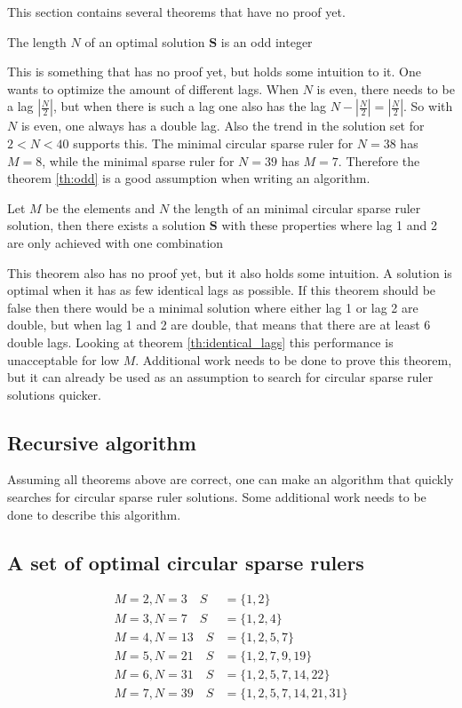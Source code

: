 \documentclass[a4paper, openany, oneside]{memoir}
\begin{document}
This section contains several theorems that have no proof yet.

\begin{blockTheorem} \label{th:odd}\nolinebreak
    The length $N$ of an optimal solution $\mathbf{S}$ is an odd integer \nolinebreak
\end{blockTheorem}

This is something that has no proof yet, but holds some intuition to it. One wants to optimize the amount of different lags. When $N$ is even, there  needs to be a lag $|\frac{N}{2}|$, but when there is such a lag one also has the lag $N-|\frac{N}{2}|=|\frac{N}{2}|$. So with $N$ is even, one always has a double lag. Also the trend in the solution set for $2<N<40$ supports this. The minimal circular sparse ruler for $N=38$ has $M=8$, while the minimal sparse ruler for $N=39$ has $M=7$. Therefore the theorem \ref{th:odd} is a good assumption when writing an algorithm.

\begin{blockTheorem} \label{th:lag1_2}\nolinebreak
    Let $M$ be the elements and $N$ the length of an minimal circular sparse ruler solution, then there exists a solution $\mathbf{S}$ with these properties where lag 1 and 2 are only achieved with one combination   \nolinebreak
\end{blockTheorem}

This theorem also has no proof yet, but it also holds some intuition. A solution is optimal when it has as few identical lags as possible. If this theorem should be false then there would be a minimal solution where either lag 1 or lag 2 are double, but when lag 1 and 2 are double, that means that there are at least 6 double lags. Looking at theorem \ref{th:identical_lags} this performance is unacceptable for low $M$. Additional work needs to be done to prove this theorem, but it can already be used as an assumption to search for circular sparse ruler solutions quicker.

\subsection{Recursive algorithm}
Assuming all theorems above are correct, one can make an algorithm that quickly searches for circular sparse ruler solutions. Some additional work needs to be done to describe this algorithm.

\subsection{A set of optimal circular sparse rulers}
\begin{align}
M=2,N=3  \quad S&=\{1,2\}\\
M=3,N=7  \quad S&=\{1,2,4\}\\
M=4,N=13 \quad S&=\{1,2,5,7\}\\
M=5,N=21 \quad S&=\{1,2,7,9, 19\}\\
M=6,N=31 \quad S&=\{1,2,5,7,14,22\}\\
M=7,N=39 \quad S&=\{1,2,5,7,14,21,31\}
\end{align}
\end{document}
